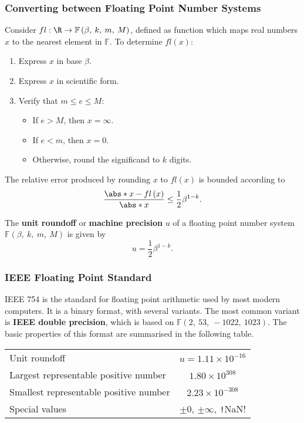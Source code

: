 \documentclass{article}
\begin{document}
\subsubsection{Converting between Floating Point Number Systems}
Consider \(fl : \R \to \mathbb{F}\left( \beta,\: k,\: m,\: M \right)\),
defined as function which maps real numbers \(x\) to the nearest
element in \(\mathbb{F}\). To determine \(fl\left( x \right)\):
\begin{enumerate}
    \item Express \(x\) in base \(\beta\).
    \item Express \(x\) in scientific form.
    \item Verify that \(m \leq e \leq M\):
          \begin{itemize}
              \item If \(e > M\), then \(x = \infty\).
              \item If \(e < m\), then \(x = 0\).
              \item Otherwise, round the significand to \(k\) digits.
          \end{itemize}
\end{enumerate}
The relative error produced by rounding \(x\) to \(fl\left( x \right)\)
is bounded according to
\begin{equation*}
    \frac{\abs*{x - fl\left( x \right)}}{\abs*{x}} \leq \frac{1}{2} \beta^{1 - k}.
\end{equation*}
\begin{definition}
    The \textbf{unit roundoff} or \textbf{machine precision} \(u\) of a
    floating point number system
    \(\mathbb{F}\left( \beta,\: k,\: m,\: M \right)\) is given by
    \begin{equation*}
        u = \frac{1}{2} \beta^{1 - k}.
    \end{equation*}
\end{definition}
\subsubsection{IEEE Floating Point Standard}
IEEE 754 is the standard for floating point arithmetic used by most
modern computers. It is a binary format, with several variants. The
most common variant is \textbf{IEEE double precision}, which is based
on \(\mathbb{F}\left( 2,\: 53,\: -1022,\: 1023 \right)\). The basic
properties of this format are summarised in the following table.
\begin{table}[H]
    \centering
    \begin{tabular}{l | c} 
        \toprule
        Unit roundoff                          & \(u = 1.11 \times 10^{-16}\)                      \\
        Largest representable positive number  & \(1.80 \times 10^{308}\)                          \\
        Smallest representable positive number & \(2.23 \times 10^{-308}\)                         \\
        Special values                         & \(\pm 0\), \(\pm \infty\), \texttt!NaN! \\
        \bottomrule
    \end{tabular}
\end{table}
\end{document}
